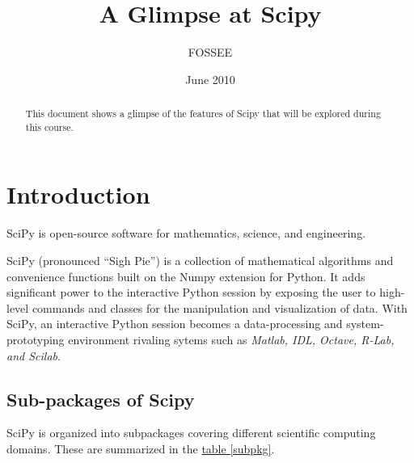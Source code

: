 \documentclass{article}
\title{A Glimpse at Scipy}
\author{FOSSEE}
\date{June 2010}
\begin{document}
\maketitle

\begin{abstract}
This document shows a glimpse of the features of Scipy that will be
explored during this course.
\end{abstract}

\section{Introduction}

SciPy is open-source software for mathematics, science, and
engineering.

SciPy (pronounced ``Sigh Pie'') is a collection of mathematical
algorithms and convenience functions built on the Numpy extension for
Python. It adds significant power to the interactive Python session by
exposing the user to high-level commands and classes for the
manipulation and visualization of data. With SciPy, an interactive
Python session becomes a data-processing and system-prototyping
environment rivaling sytems such as \emph{Matlab, IDL, Octave, R-Lab,
  and Scilab}. \cite{scipy}


\subsection{Sub-packages of Scipy}

SciPy is organized into subpackages covering different scientific
computing domains. These are summarized in the \underline{table
  \ref{subpkg}}.
\end{document}
